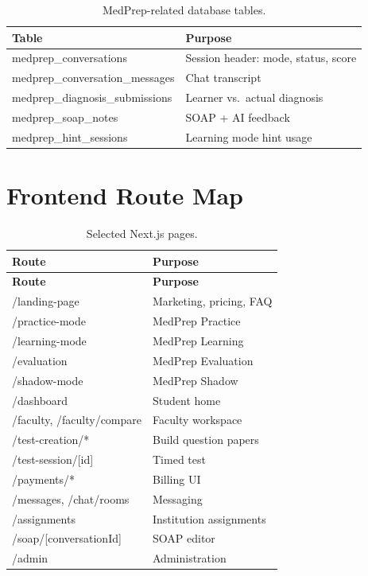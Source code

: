 \begin{table}[htbp]
  \centering
  \caption{MedPrep-related database tables.}
  \label{tab:medprep-tables}
  \begin{tabular}{@{}lp{9.5cm}@{}}
    \toprule
    \textbf{Table} & \textbf{Purpose} \\
    \midrule
    medprep\_conversations & Session header: mode, status, score \\
    medprep\_conversation\_messages & Chat transcript \\
    medprep\_diagnosis\_submissions & Learner vs.\ actual diagnosis \\
    medprep\_soap\_notes & SOAP + AI feedback \\
    medprep\_hint\_sessions & Learning mode hint usage \\
    \bottomrule
  \end{tabular}
\end{table}

\chapter{Frontend Route Map}
\label{app:routes}

\begin{longtable}{@{}p{4.5cm}p{9.5cm}@{}}
  \caption{Selected Next.js pages.} \label{tab:routes} \\
  \toprule
  \textbf{Route} & \textbf{Purpose} \\
  \midrule
  \endfirsthead
  \toprule
  \textbf{Route} & \textbf{Purpose} \\
  \midrule
  \endhead
  /landing-page & Marketing, pricing, FAQ \\
  /practice-mode & MedPrep Practice \\
  /learning-mode & MedPrep Learning \\
  /evaluation & MedPrep Evaluation \\
  /shadow-mode & MedPrep Shadow \\
  /dashboard & Student home \\
  /faculty, /faculty/compare & Faculty workspace \\
  /test-creation/* & Build question papers \\
  /test-session/[id] & Timed test \\
  /payments/* & Billing UI \\
  /messages, /chat/rooms & Messaging \\
  /assignments & Institution assignments \\
  /soap/[conversationId] & SOAP editor \\
  /admin & Administration \\
  \bottomrule
\end{longtable}

